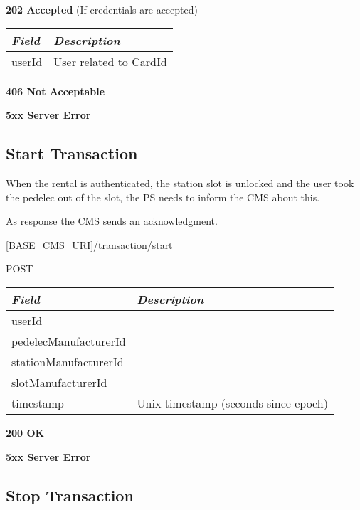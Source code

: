 \textbf{202 Accepted} (If credentials are accepted)

\begin{tabularx}{\linewidth}{ | l | X | }
  \hline
  \textit{Field} & \textit{Description} \\
  \hline \hline
  userId						& User related to CardId \\
    \hline
\end{tabularx}

 \textbf{406 Not Acceptable}

\textbf{5xx Server Error}

\subsection{Start Transaction}

When the rental is authenticated, the station slot is unlocked and the user took the pedelec out of the slot, the \acs{PS} needs to inform the \acs{CMS} about this.

As response the \acs{CMS} sends an acknowledgment.

 \url{[BASE_CMS_URI]/transaction/start}

 POST

\newpage
{} 
\begin{table}[!h]
\vspace{-7mm}
\begin{tabularx}{\linewidth}{ | l | X | }
  \hline
  \textit{Field} & \textit{Description} \\
  \hline \hline
  	userId 		& \\
  	pedelecManufacturerId			& \\
  	stationManufacturerId			& \\
  	slotManufacturerId			& \\
  	timestamp					& Unix timestamp (seconds since epoch) \\
    \hline
\end{tabularx}
\end{table}

 \textbf{200 OK}

 \textbf{5xx Server Error}

\subsection{Stop Transaction}

